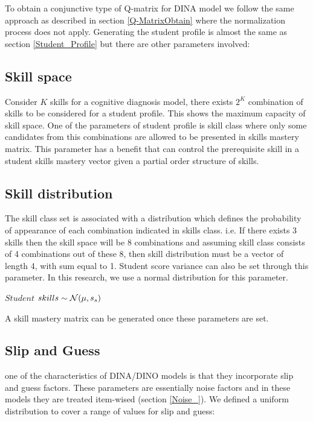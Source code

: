 To obtain a conjunctive type of Q-matrix for DINA model we follow the same approach as described in section \ref{Q-MatrixObtain} where the normalization process does not apply.  Generating the student profile is almost the same as section \ref{Student_Profile} but there are other parameters involved:


\subsection{Skill space}
Consider $K$ skills for a cognitive diagnosis model, there exists $2^K$ combination of skills to be considered for a student profile. This shows the maximum capacity of skill space. One of the parameters of student profile is skill class where only some candidates from this combinations are allowed to be presented in skills mastery matrix. This parameter has a benefit that can control the prerequisite skill in a student skills mastery vector given a partial order structure of skills.

\subsection{Skill distribution}

The skill class set is associated with a distribution which defines the probability of appearance of each combination indicated in skills class. i.e. If there exists 3 skills then the skill space will be 8 combinations and assuming skill class consists of 4 combinations out of these 8, then skill distribution  must be a vector of length 4, with sum equal to 1. Student score variance can also be set through this parameter. In this research, we use a normal distribution for this parameter.



\begin{center}
$Student$  $skills \sim \mathcal{N}(\mu, s_s)$
\end{center}

A skill mastery matrix can be generated once these parameters are set.


\subsection{Slip and Guess}
one of the characteristics of DINA/DINO models is that they incorporate slip and guess factors. These parameters are essentially noise factors and in these models they are treated item-wised (section \ref{Noise_}). We defined a uniform distribution to cover a range of values for slip and guess:


